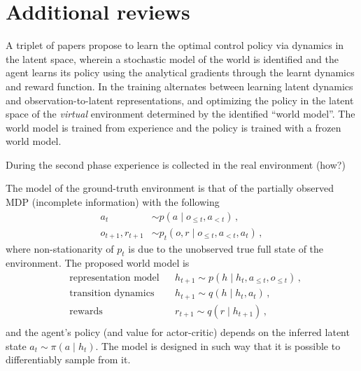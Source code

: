 \documentclass[acmsmall, nonacm]{acmart}
\begin{document}
\section{Additional reviews}

\medskip

A triplet of papers \citep{hafner_learning_2019,hafner_dream_2020,hafner_mastering_2020} propose
to learn the optimal control policy via dynamics in the latent space, wherein a stochastic
model of the world is identified and the agent learns its policy using the analytical
gradients through the learnt dynamics and reward function.
%
In \citep[alg.~1]{hafner_dream_2020} the training alternates between learning latent dynamics
and observation-to-latent representations, and optimizing the policy in the latent space of
the \emph{virtual} environment determined by the identified ``world model''.
The world model is trained from experience and the policy is trained with a frozen world model.

During the second phase experience is collected in the real environment (how?)

The model of the ground-truth environment is that of the partially observed MDP (incomplete
information) with the following
\begin{align*}
  a_t & \sim p(a \mid o_{\leq t}, a_{< t})
    \,, \\
  o_{t+1}, r_{t+1}
    & \sim p_t(o, r \mid o_{\leq t}, a_{< t}, a_t)
    \,,
\end{align*}
where non-stationarity of $p_t$ is due to the unobserved true full state of the environment.
% 
The proposed world model is
\begin{equation*}
  \begin{aligned}
    & \text{representation model}
      & & h_{t+1} \sim p(h \mid h_t, a_{\leq t}, o_{\leq t})
          \,, \\
    & \text{transition dynamics}
      & & h_{t+1} \sim q(h \mid h_t, a_t)
          \,, \\
    & \text{rewards}
      & & r_{t+1} \sim q(r \mid h_{t+1})
          \,, \\
  \end{aligned}
\end{equation*}
and the agent's policy (and value for actor-critic) depends on the inferred latent state $
  a_t \sim \pi(a\mid h_t)
$. The model is designed in such way that it is possible to differentiably sample from it.
\end{document}
